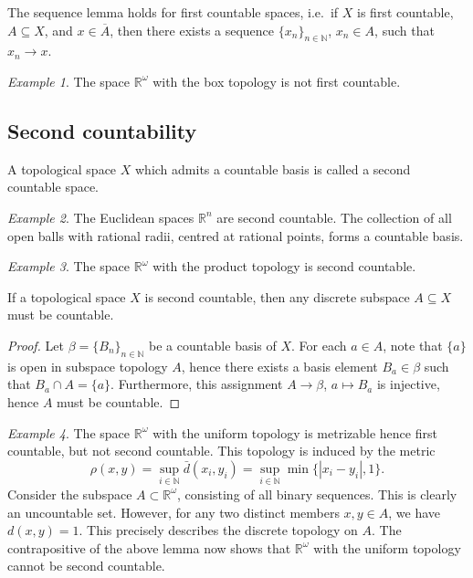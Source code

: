 \documentclass[11pt]{article}
\newcommand{\R}{\mathbb{R}}
\newcommand{\N}{\mathbb{N}}
\theoremstyle{definition}
\theoremstyle{remark}
\newtheorem*{example}{Example}
\numberwithin{equation}{section}
\begin{document}
    \begin{lemma}
        The sequence lemma holds for first countable spaces, i.e.\ if $X$ is first
        countable, $A \subseteq X$, and $x \in \overline{A}$, then there exists a
        sequence $\{x_n\}_{n \in \N}$, $x_n \in A$, such that $x_n \to x$.
    \end{lemma}

    \begin{example}
        The space $\R^\omega$ with the box topology is not first countable.
    \end{example}


    \subsection{Second countability}
    
    \begin{definition}
        A topological space $X$ which admits a countable basis is called a second
        countable space.
    \end{definition}
    \begin{example}
        The Euclidean spaces $\R^n$ are second countable. The collection of all open
        balls with rational radii, centred at rational points, forms a countable basis.
    \end{example}
    \begin{example}
        The space $\R^\omega$ with the product topology is second countable.
    \end{example}
    \begin{lemma}
        If a topological space $X$ is second countable, then any discrete subspace
        $A\subseteq X$ must be countable.
    \end{lemma}

    \begin{proof}
        Let $\beta = \{B_n\}_{n \in \N}$ be a countable basis of $X$. For each $a \in
        A$, note that $\{a\}$ is open in subspace topology $A$, hence there exists a
        basis element $B_a \in \beta$ such that $B_a \cap A = \{a\}$. Furthermore,
        this assignment $A \to \beta$, $a \mapsto B_a$ is injective, hence $A$ must
        be countable.
    \end{proof}

    \begin{example}
        The space $\R^\omega$ with the uniform topology is metrizable hence first
        countable, but not second countable. This topology is induced by the metric
        \[
            \rho(x, y) = \sup_{i \in \N} \bar{d}(x_i, y_i) = \sup_{i \in \N}
            \min\{|x_i - y_i|, 1\}.
        \] Consider the subspace $A \subset \R^\omega$, consisting of all binary
        sequences. This is clearly an uncountable set. However, for any two distinct
        members $x, y \in A$, we have $d(x, y) = 1$. This precisely describes the
        discrete topology on $A$. The contrapositive of the above lemma now shows
        that $\R^\omega$ with the uniform topology cannot be second countable.
    \end{example}
\end{document}
